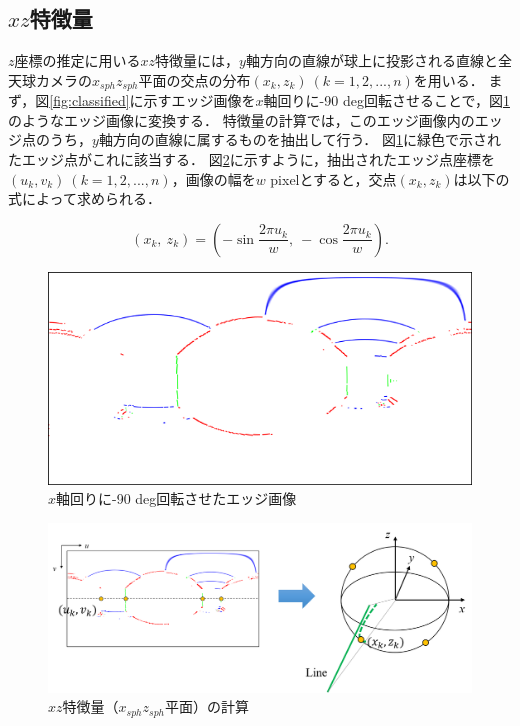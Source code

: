 \clearpage
\subsection{$xz$特徴量}
$z$座標の推定に用いる$xz$特徴量には，$y$軸方向の直線が球上に投影される直線と全天球カメラの$x_{sph}z_{sph}$平面の交点の分布$(x_k,z_k)\ (k=1, 2,..., n)$を用いる．
まず，図\ref{fig:classified}に示すエッジ画像を$x$軸回りに-90 deg回転させることで，図\ref{fig:rotated_edge}のようなエッジ画像に変換する．
特徴量の計算では，このエッジ画像内のエッジ点のうち，$y$軸方向の直線に属するものを抽出して行う．
図\ref{fig:rotated_edge}に緑色で示されたエッジ点がこれに該当する．
図\ref{fig:feature_xz}に示すように，抽出されたエッジ点座標を$(u_k, v_k)\ (k=1, 2,..., n)$，画像の幅を$w$ pixelとすると，交点$(x_k,z_k)$は以下の式によって求められる．

\begin{equation}
   \left(x_k,\ z_k\right) = \left(-\sin\frac{2\pi u_k}{w},\ -\cos\frac{2\pi u_k}{w}\right).
\end{equation}

\begin{figure}[b]
 \begin{center}
 \includegraphics[width=0.7\columnwidth]{./chap4/fig/rotated_edge.png}
 \vspace{5mm}
 \caption{$x$軸回りに-90 deg回転させたエッジ画像}
 \label{fig:rotated_edge}
 \end{center}
\end{figure}


\begin{figure}[b]
 \begin{center}
 \includegraphics[width=1.0\columnwidth]{./chap4/fig/feature_xz.png}
 \vspace{5mm}
 \caption{$xz$特徴量（$x_{sph}z_{sph}$平面）の計算}
 \label{fig:feature_xz}
 \end{center}
\end{figure}


